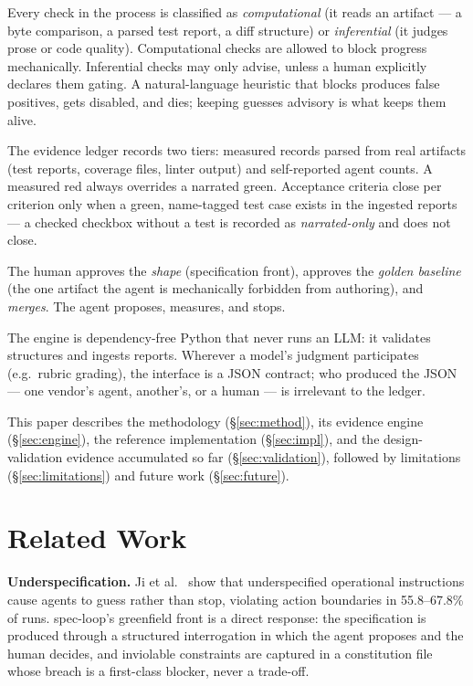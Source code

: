 \documentclass[11pt]{article}
\begin{document}
\begin{description}[leftmargin=1.2em]
\item[Facts block; guesses advise.] Every check in the process is classified as
\emph{computational} (it reads an artifact --- a byte comparison, a parsed test
report, a diff structure) or \emph{inferential} (it judges prose or code
quality). Computational checks are allowed to block progress mechanically.
Inferential checks may only advise, unless a human explicitly declares them
gating. A natural-language heuristic that blocks produces false positives, gets
disabled, and dies; keeping guesses advisory is what keeps them alive.
\item[Measured beats narrated.] The evidence ledger records two tiers: measured
records parsed from real artifacts (test reports, coverage files, linter
output) and self-reported agent counts. A measured red always overrides a
narrated green. Acceptance criteria close per criterion only when a green,
name-tagged test case exists in the ingested reports --- a checked checkbox
without a test is recorded as \emph{narrated-only} and does not close.
\item[The human at three fixed points.] The human approves the \emph{shape}
(specification front), approves the \emph{golden baseline} (the one artifact
the agent is mechanically forbidden from authoring), and \emph{merges}. The
agent proposes, measures, and stops.
\item[Tool-agnosticism by contract.] The engine is dependency-free Python that
never runs an LLM: it validates structures and ingests reports. Wherever a
model's judgment participates (e.g.\ rubric grading), the interface is a JSON
contract; who produced the JSON --- one vendor's agent, another's, or a human
--- is irrelevant to the ledger.
\end{description}

This paper describes the methodology (\S\ref{sec:method}), its evidence engine
(\S\ref{sec:engine}), the reference implementation (\S\ref{sec:impl}), and the
design-validation evidence accumulated so far (\S\ref{sec:validation}),
followed by limitations (\S\ref{sec:limitations}) and future work
(\S\ref{sec:future}).

\section{Related Work}\label{sec:related}

\textbf{Underspecification.} Ji et al.~\cite{ji2026guessing} show that
underspecified operational instructions cause agents to guess rather than
stop, violating action boundaries in 55.8--67.8\% of runs. spec-loop's
greenfield front is a direct response: the specification is produced through a
structured interrogation in which the agent proposes and the human decides,
and inviolable constraints are captured in a constitution file whose breach is
a first-class blocker, never a trade-off.
\end{document}
